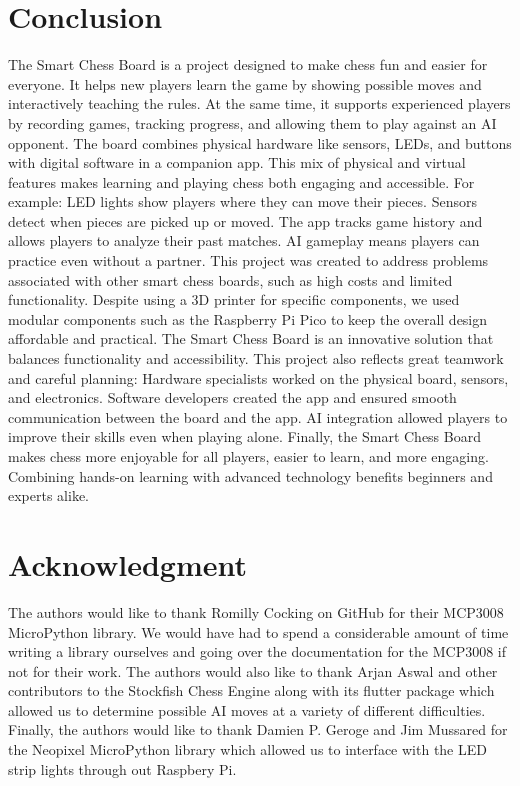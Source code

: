 \documentclass[11pt,journal]{IEEEtran}
\begin{document}
% 


\section{Conclusion}
The Smart Chess Board is a project designed to make chess fun and easier for everyone. It helps new players learn the game by showing possible moves and interactively teaching the rules. At the same time, it supports experienced players by recording games, tracking progress, and allowing them to play against an AI opponent.
The board combines physical hardware like sensors, LEDs, and buttons with digital software in a companion app. This mix of physical and virtual features makes learning and playing chess both engaging and accessible. For example:
LED lights show players where they can move their pieces.
Sensors detect when pieces are picked up or moved.
The app tracks game history and allows players to analyze their past matches.
AI gameplay means players can practice even without a partner.
This project was created to address problems associated with other smart chess boards, such as high costs and limited functionality. Despite using a 3D printer for specific components, we used modular components such as the Raspberry Pi Pico to keep the overall design affordable and practical. The Smart Chess Board is an innovative solution that balances functionality and accessibility.
This project also reflects great teamwork and careful planning:
Hardware specialists worked on the physical board, sensors, and electronics.
Software developers created the app and ensured smooth communication between the board and the app.
AI integration allowed players to improve their skills even when playing alone.
Finally, the Smart Chess Board makes chess more enjoyable for all players, easier to learn, and more engaging. Combining hands-on learning with advanced technology benefits beginners and experts alike.


\section*{Acknowledgment}

The authors would like to thank Romilly Cocking on GitHub for their MCP3008 MicroPython library. We would have had to spend a considerable amount of time writing a library ourselves and going over the documentation for the MCP3008 if not for their work.\cite{cocking_pico_code_2023} The authors would also like to thank Arjan Aswal and other contributors to the Stockfish Chess Engine along with its flutter package which allowed us to determine possible AI moves at a variety of different difficulties. \cite{stockfish} Finally, the authors would like to thank Damien P. Geroge and Jim Mussared for the Neopixel MicroPython library which allowed us to interface with the LED strip lights through out Raspbery Pi.\cite{neopixel}




\end{document}
